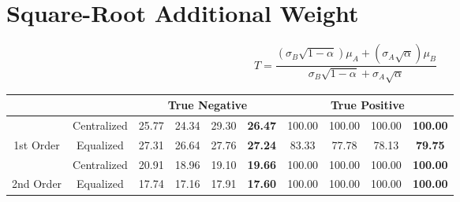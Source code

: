 \documentclass[10pt,a4paper]{article}
\begin{document}
	\section{Square-Root Additional Weight}
		$$T = \frac{(\sigma_B \sqrt{1 - \alpha}) \mu_A + (\sigma_A \sqrt{\alpha}) \mu_B}{\sigma_B \sqrt{1 - \alpha} + \sigma_A \sqrt{\alpha}}$$
		\begin{table}[!h]
			\centering
			\begin{tabular}{|c|c|c|c|c|c|c|c|c|c|}
				\hline
				&             & \multicolumn{4}{c|}{True Negative}                            & \multicolumn{4}{c|}{True Positive}                                \\ \hline
				& Centralized & 25.77 & 24.34 & 29.30 & {\color[HTML]{FE0000} \textbf{26.47}} & 100.00 & 100.00 & 100.00 & {\color[HTML]{FE0000} \textbf{100.00}} \\ \cline{2-10} 
				\multirow{-2}{*}{1st Order} & Equalized   & 27.31 & 26.64 & 27.76 & {\color[HTML]{FE0000} \textbf{27.24}} & 83.33  & 77.78  & 78.13  & {\color[HTML]{FE0000} \textbf{79.75}}  \\ \hline
				& Centralized & 20.91 & 18.96 & 19.10 & {\color[HTML]{FE0000} \textbf{19.66}} & 100.00 & 100.00 & 100.00 & {\color[HTML]{FE0000} \textbf{100.00}} \\ \cline{2-10} 
				\multirow{-2}{*}{2nd Order} & Equalized   & 17.74 & 17.16 & 17.91 & {\color[HTML]{FE0000} \textbf{17.60}} & 100.00 & 100.00 & 100.00 & {\color[HTML]{FE0000} \textbf{100.00}} \\ \hline
			\end{tabular}
		\end{table}
	
\end{document}
